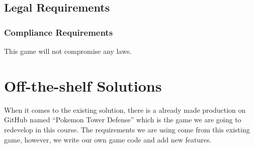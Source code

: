 \documentclass{article}
\begin{document}
\subsection{Legal Requirements}
\subsubsection{Compliance Requirements}
This game will not compromise any laws.

\section{Off-the-shelf Solutions}
When it comes to the existing solution, there is a already made production on GitHub named “Pokemon Tower Defense” which is the game we are going to redevelop in this course. The requirements we are using come from this existing game, however, we write our own game code and add new features.

 
\end{document}
